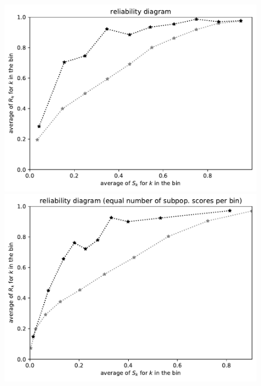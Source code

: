 \documentclass{article}
\begin{document}
\begin{figure}
\begin{centering}
\parbox{\imsize}{\includegraphics[width=\imsize]
                {./codes/unweighted/50000_5000_10_0/equiscore.pdf}}
\quad\quad
\parbox{\imsize}{\includegraphics[width=\imsize]
                {./codes/unweighted/50000_5000_10_0/equisamps.pdf}}

\vspace{\vertsep}


\end{centering}
\end{figure}
\end{document}

